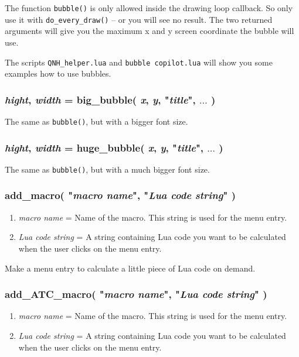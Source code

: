 \documentclass[11pt,parskip=half,a4paper]{scrartcl}
\begin{document}
The function \verb|bubble()| is only allowed inside the drawing loop callback. So only use it with \verb|do_every_draw()| -- or you will see no result. The two returned arguments will give you the maximum x and y screen coordinate the bubble will use.

The scripts \verb|QNH_helper.lua| and \verb|bubble copilot.lua| will show you some examples how to use bubbles.

\subsubsection{\emph{hight}, \emph{width} = big\_bubble( \emph{x}, \emph{y}, "\emph{title}", $\dots$ )}

The same as \verb|bubble()|, but with a bigger font size.

\subsubsection{\emph{hight}, \emph{width} = huge\_bubble( \emph{x}, \emph{y}, "\emph{title}", $\dots$ )}

The same as \verb|bubble()|, but with a much bigger font size.



\subsubsection{add\_macro( "\emph{macro name}", "\emph{Lua code string}" )}

\begin{enumerate}
	\item \emph{macro name} = Name of the macro. This string is used for the menu entry.
	\item \emph{Lua code string} = A string containing Lua code you want to be calculated when the user clicks on the menu entry.
\end{enumerate}

Make a menu entry to calculate a little piece of Lua code on demand.

\subsubsection{add\_ATC\_macro( "\emph{macro name}", "\emph{Lua code string}" )}

\begin{enumerate}
	\item \emph{macro name} = Name of the macro. This string is used for the menu entry.
	\item \emph{Lua code string} = A string containing Lua code you want to be calculated when the user clicks on the menu entry.
\end{enumerate}
\end{document}
